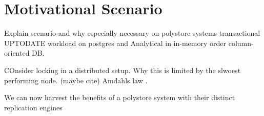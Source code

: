 \chapter{Motivational Scenario}
\label{c:motivation}

Explain scenario and why especially necessary on polystore systems
transactional UPTODATE workload on postgres and 
Analytical in in-memory order column-oriented DB. 


COnsider locking in a distributed setup. Why this is limited by the slwoest performing node.
(maybe cite) Amdahls law .

We can now harvest the benefits of a polystore system with their distinct replication engines